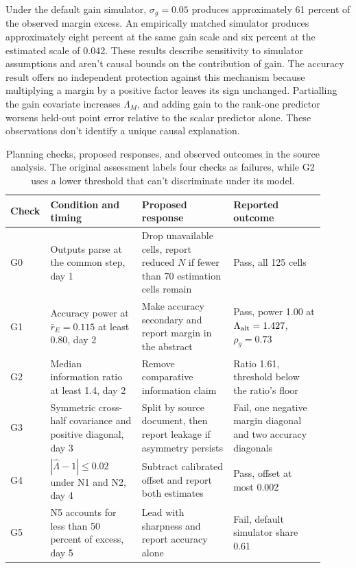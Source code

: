 Under the default gain simulator, $\sigma_g=0.05$ produces approximately 61 percent of the observed margin excess. An empirically matched simulator produces approximately eight percent at the same gain scale and six percent at the estimated scale of 0.042. These results describe sensitivity to simulator assumptions and aren't causal bounds on the contribution of gain. The accuracy result offers no independent protection against this mechanism because multiplying a margin by a positive factor leaves its sign unchanged. Partialling the gain covariate increases $\Lambda_M$, and adding gain to the rank-one predictor worsens held-out point error relative to the scalar predictor alone. These observations don't identify a unique causal explanation.

\begin{table}[!htb]
\centering
\caption{Planning checks, proposed responses, and observed outcomes in the source analysis. The original assessment labels four checks as failures, while G2 uses a lower threshold that can't discriminate under its model.}
\label{tab:original5}
\small\setlength{\tabcolsep}{4pt}\renewcommand{\arraystretch}{1.12}
\begin{tabular}{L{0.07\linewidth}L{0.28\linewidth}L{0.28\linewidth}L{0.28\linewidth}}\toprule
Check & Condition and timing & Proposed response & Reported outcome\\\midrule
G0 & Outputs parse at the common step, day 1 & Drop unavailable cells, report reduced $N$ if fewer than 70 estimation cells remain & Pass, all 125 cells\\
G1 & Accuracy power at $\bar r_E=0.115$ at least 0.80, day 2 & Make accuracy secondary and report margin in the abstract & Pass, power 1.00 at $\Lambda_{\rm alt}=1.427$, $\rho_g=0.73$\\
G2 & Median information ratio at least 1.4, day 2 & Remove comparative information claim & Ratio 1.61, threshold below the ratio's floor\\
G3 & Symmetric cross-half covariance and positive diagonal, day 3 & Split by source document, then report leakage if asymmetry persists & Fail, one negative margin diagonal and two accuracy diagonals\\
G4 & $|\widehat\Lambda-1|\leq0.02$ under N1 and N2, day 4 & Subtract calibrated offset and report both estimates & Pass, offset at most 0.002\\
G5 & N5 accounts for less than 50 percent of excess, day 5 & Lead with sharpness and report accuracy alone & Fail, default simulator share 0.61\\

\end{tabular}
\end{table}
